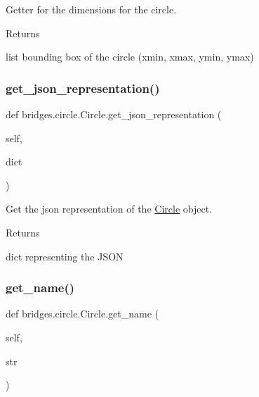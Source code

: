 Getter for the dimensions for the circle. 

\begin{DoxyReturn}{Returns}


list bounding box of the circle (xmin, xmax, ymin, ymax) 
\end{DoxyReturn}
\mbox{\label{classbridges_1_1circle_1_1_circle_a7a1be40bcd6028dab0a5bcab6e69c355}} 
\subsubsection{\texorpdfstring{get\+\_\+json\+\_\+representation()}{get\_json\_representation()}}
{\footnotesize\ttfamily def bridges.\+circle.\+Circle.\+get\+\_\+json\+\_\+representation (\begin{DoxyParamCaption}\item[{}]{self,  }\item[{}]{dict }\end{DoxyParamCaption})}



Get the json representation of the \hyperlink{classbridges_1_1circle_1_1_circle}{Circle} object. 

\begin{DoxyReturn}{Returns}


dict representing the J\+S\+ON 
\end{DoxyReturn}
\mbox{\label{classbridges_1_1circle_1_1_circle_acacc4d8cc5f2db86cfcba61f31652003}} 
\subsubsection{\texorpdfstring{get\+\_\+name()}{get\_name()}}
{\footnotesize\ttfamily def bridges.\+circle.\+Circle.\+get\+\_\+name (\begin{DoxyParamCaption}\item[{}]{self,  }\item[{}]{str }\end{DoxyParamCaption})}



